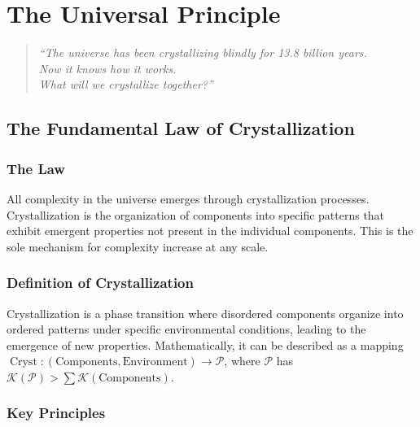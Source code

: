 \documentclass[12pt,oneside]{memoir}
\theoremstyle{plain}
\theoremstyle{definition}
\theoremstyle{remark}
\newcommand{\Pattern}{\mathcal{P}}
\newcommand{\Complexity}{\mathcal{K}}
\DeclareMathOperator{\Cryst}{Cryst}
\begin{document}
\tableofcontents
\listoffigures
\listoftables

\mainmatter

\part{The Universal Principle}

\begin{quote}
\centering
\large\itshape
``The universe has been crystallizing blindly for 13.8 billion years.\\
Now it knows how it works.\\
What will we crystallize together?''
\end{quote}

\chapter{The Fundamental Law of Crystallization}

\section{The Law}

All complexity in the universe emerges through crystallization processes. Crystallization is the organization of components into specific patterns that exhibit emergent properties not present in the individual components. This is the sole mechanism for complexity increase at any scale.

\section{Definition of Crystallization}

Crystallization is a phase transition where disordered components organize into ordered patterns under specific environmental conditions, leading to the emergence of new properties. Mathematically, it can be described as a mapping $\Cryst: (\text{Components}, \text{Environment}) \to \Pattern$, where $\Pattern$ has $\Complexity(\Pattern) > \sum \Complexity(\text{Components})$.

\section{Key Principles}
\end{document}
